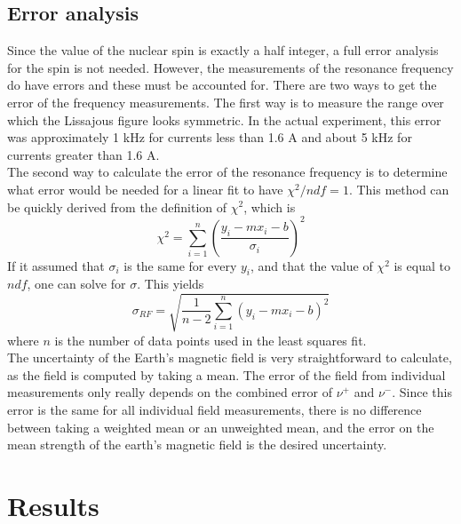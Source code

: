 \documentclass[11pt,letterpaper]{article}
\begin{document}
\subsection{Error analysis}

Since the value of the nuclear spin is exactly a half integer, a full error
analysis for the spin is not needed. However, the measurements of the resonance
frequency do have errors and these must be accounted for. There are two ways to
get the error of the frequency measurements. The first way is to measure the
range over which the Lissajous figure looks symmetric. In the actual experiment,
this error was approximately 1 kHz for currents less than 1.6 A and about 5 kHz
for currents greater than 1.6 A.\\

The second way to calculate the error of the resonance frequency is to determine
what error would be needed for a linear fit to have $\chi^2 / ndf = 1$. This
method can be quickly derived from the definition of $\chi^2$, which is
\cite{LyonsError}
\begin{equation}
    \chi^2 = \sum_{i=1}^{n}\left(\frac{y_i - m x_i - b}{\sigma_i} \right)^2
\end{equation}
If it assumed that $\sigma_i$ is the same for every $y_i$, and that the value of
$\chi^2$ is equal to $ndf$, one can solve for $\sigma$. This yields
\begin{equation}
    \sigma_{RF} = \sqrt{\frac{1}{n-2}\sum_{i=1}^n \left(y_i-mx_i-b\right)^2}
\end{equation}
where $n$ is the number of data points used in the least squares fit.\\

The uncertainty of the Earth's magnetic field is very straightforward to
calculate, as the field is computed by taking a mean. The error of the field
from individual measurements only really depends on the combined error of
$\nu^+$ and $\nu^-$. Since this error is the same for all individual field
measurements, there is no difference between taking a weighted mean or an
unweighted mean, and the error on the mean strength of the earth's magnetic
field is the desired uncertainty.

\section{Results}
\end{document}
